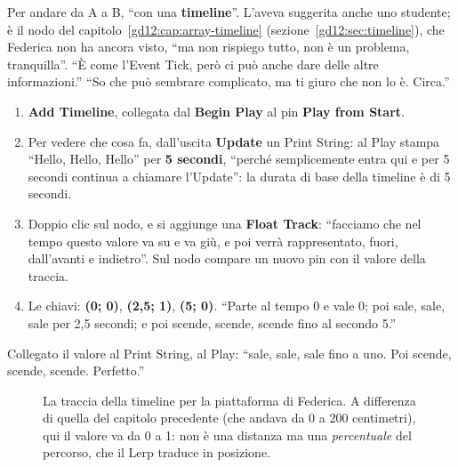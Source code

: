 Per andare da A a B, ``con una \textbf{timeline}''. L'aveva suggerita anche uno
studente; è il nodo del capitolo~\ref{gd12:cap:array-timeline}
(sezione~\ref{gd12:sec:timeline}), che Federica non ha ancora visto, ``ma non
rispiego tutto, non è un problema, tranquilla''. ``È come l'Event Tick, però ci
può anche dare delle altre informazioni.'' ``So che può sembrare complicato, ma
ti giuro che non lo è. Circa.''
\begin{enumerate}
  \item \textbf{Add Timeline}, collegata dal \textbf{Begin Play} al pin
        \textbf{Play from Start}.
  \item Per vedere che cosa fa, dall'uscita \textbf{Update} un Print String: al
        Play stampa ``Hello, Hello, Hello'' per \textbf{5 secondi}, ``perché
        semplicemente entra qui e per 5 secondi continua a chiamare l'Update'':
        la durata di base della timeline è di 5 secondi.
  \item Doppio clic sul nodo, e si aggiunge una \textbf{Float Track}: ``facciamo
        che nel tempo questo valore va su e va giù, e poi verrà rappresentato,
        fuori, dall'avanti e indietro''. Sul nodo compare un nuovo pin con il
        valore della traccia.
  \item Le chiavi: \textbf{(0; 0)}, \textbf{(2,5; 1)}, \textbf{(5; 0)}. ``Parte
        al tempo 0 e vale 0; poi sale, sale, sale per 2,5 secondi; e poi scende,
        scende, scende fino al secondo 5.''
\end{enumerate}
Collegato il valore al Print String, al Play: ``sale, sale, sale fino a uno.
Poi scende, scende, scende. Perfetto.''

\begin{figure}[htbp]
\centering
{}
\caption{La traccia della timeline per la piattaforma di Federica. A differenza
di quella del capitolo precedente (che andava da 0 a 200 centimetri), qui il
valore va da 0 a 1: non è una distanza ma una \emph{percentuale} del percorso,
che il Lerp traduce in posizione.}
\label{gd13:fig:curva-lerp}
\end{figure}

